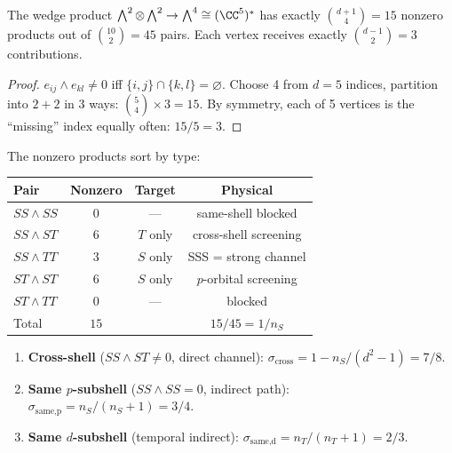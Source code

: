 \begin{theorem}
\label{thm:wedge_count}
The wedge product $\bigwedge^2 \otimes \bigwedge^2 \to \bigwedge^4 \cong (\CC^5)^*$ has exactly $\binom{d+1}{4} = 15$ nonzero products out of $\binom{10}{2} = 45$ pairs.  Each vertex receives exactly $\binom{d-1}{2} = 3$ contributions.
\end{theorem}

\begin{proof}
$e_{ij} \wedge e_{kl} \neq 0$ iff $\{i,j\} \cap \{k,l\} = \varnothing$.  Choose 4 from $d=5$ indices, partition into $2{+}2$ in $3$ ways: $\binom{5}{4} \times 3 = 15$.  By symmetry, each of 5 vertices is the ``missing'' index equally often: $15/5 = 3$.
\end{proof}

The nonzero products sort by type:
\begin{center}
\begin{tabular}{lccc}
\hline
Pair & Nonzero & Target & Physical \\
\hline
$SS \wedge SS$ & $0$ & --- & same-shell blocked \\
$SS \wedge ST$ & $6$ & $T$ only & cross-shell screening \\
$SS \wedge TT$ & $3$ & $S$ only & SSS = strong channel \\
$ST \wedge ST$ & $6$ & $S$ only & $p$-orbital screening \\
$ST \wedge TT$ & $0$ & --- & blocked \\
\hline
Total & $15$ & & $15/45 = 1/n_S$ \\
\hline
\end{tabular}
\end{center}

\begin{theorem}
\label{thm:sigma_wedge}
\leavevmode
\begin{enumerate}
\item \textbf{Cross-shell} ($SS \wedge ST \neq 0$, direct channel):
$\sigma_\text{cross} = 1 - n_S/(d^2\!-\!1) = 7/8$.

\item \textbf{Same $p$-subshell} ($SS \wedge SS = 0$, indirect path):
$\sigma_\text{same,p} = n_S/(n_S\!+\!1) = 3/4$.

\item \textbf{Same $d$-subshell} (temporal indirect):
$\sigma_\text{same,d} = n_T/(n_T\!+\!1) = 2/3$.
\end{enumerate}
\end{theorem}

